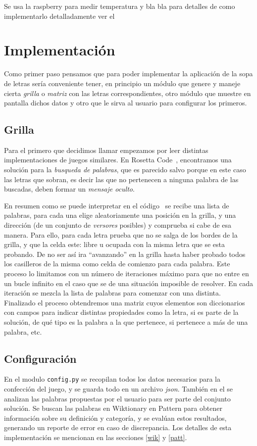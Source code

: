 Se usa la raspberry para medir temperatura y bla bla para detalles de como implementarlo detalladamente ver el~\autocite{anexoraspberry}

\chapter{Implementación}

Como primer paso pensamos que para poder implementar la aplicación de la sopa de letras sería conveniente tener, en principio un módulo que genere y maneje cierta \emph{grilla} o \emph{matriz} con las letras correspondientes, otro módulo que muestre en pantalla dichos datos y otro que le sirva al usuario para configurar los primeros.


\section{Grilla}\label{grilla}
Para el primero que decidimos llamar  empezamos por leer distintas implementaciones de juegos similares. En Rosetta Code~\autocite{rosetta}, encontramos una solución para la \emph{busqueda de palabras}, que es parecido salvo porque en este caso las letras que sobran, es decir las que no pertenecen a ninguna palabra de las buscadas, deben formar un \emph{mensaje oculto}.

En resumen como se puede interpretar en el código~\autocite{anexogrilla} se recibe una lista de palabras, para cada una elige aleatoriamente una posición en la grilla, y una dirección (de un conjunto de \emph{versores} posibles) y comprueba si cabe de esa manera. Para ello, para cada letra prueba que no se salga de los bordes de la grilla, y que la celda este: libre u ocupada con la misma letra que se esta probando. De no ser así ira ``avanzando'' en la grilla hasta haber probado todos los casilleros de la misma como celda de comienzo para cada palabra. Este proceso lo limitamos con un número de iteraciones máximo para que no entre en un bucle infinito en el caso que se de una situación imposible de resolver. En cada iteración se mezcla la lista de palabras para comenzar con una distinta.
Finalizado el proceso obtendremos una matriz cuyos elementos son diccionarios con campos para indicar distintas propiedades como la letra, si es parte de la solución, de qué tipo es la palabra a la que pertenece, si pertenece a más de una palabra, etc.

\section{Configuración}\label{config}
En el modulo \texttt{config.py} se recopilan todos los datos necesarios para la confección del juego, y se guarda todo en un archivo \emph{json}. También en el se analizan las palabras propuestas por el usuario para ser parte del conjunto solución. Se buscan las palabras en Wiktionary en Pattern para obtener información sobre su definición y categoría, y se evalúan estos resultados, generando un reporte de error en caso de discrepancia. Los detalles de esta implementación se mencionan en las secciones \ref{wik} y \ref{patt}.

